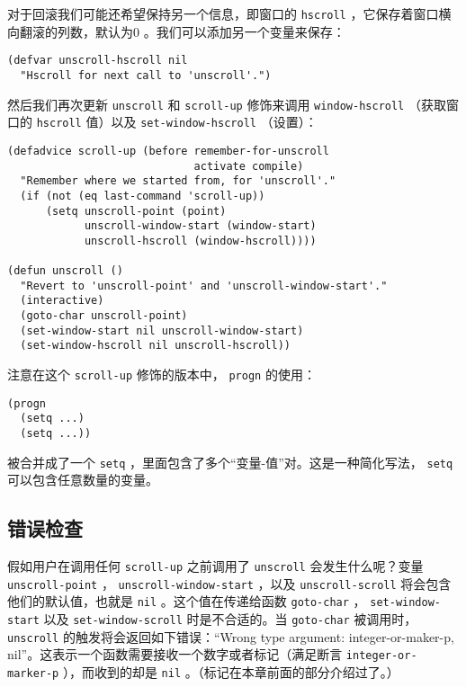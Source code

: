 对于回滚我们可能还希望保持另一个信息，即窗口的 \texttt{hscroll} ，它保存着窗口横向翻滚的列数，默认为0 。我们可以添加另一个变量来保存：

\begin{verbatim}
(defvar unscroll-hscroll nil
  "Hscroll for next call to 'unscroll'.")
\end{verbatim}

然后我们再次更新 \texttt{unscroll} 和 \texttt{scroll-up} 修饰来调用 \texttt{window-hscroll} （获取窗口的 \texttt{hscroll} 值）以及 \texttt{set-window-hscroll} （设置）：

\begin{verbatim}
(defadvice scroll-up (before remember-for-unscroll
                             activate compile)
  "Remember where we started from, for 'unscroll'."
  (if (not (eq last-command 'scroll-up))
      (setq unscroll-point (point)
            unscroll-window-start (window-start)
            unscroll-hscroll (window-hscroll))))

(defun unscroll ()
  "Revert to 'unscroll-point' and 'unscroll-window-start'."
  (interactive)
  (goto-char unscroll-point)
  (set-window-start nil unscroll-window-start)
  (set-window-hscroll nil unscroll-hscroll))
\end{verbatim}

注意在这个 \texttt{scroll-up} 修饰的版本中， \texttt{progn} 的使用：

\begin{verbatim}
(progn
  (setq ...)
  (setq ...))
\end{verbatim}

被合并成了一个 \texttt{setq} ，里面包含了多个“变量-值”对。这是一种简化写法， \texttt{setq} 可以包含任意数量的变量。

\subsection{错误检查}
\label{section:03-Detecting-Errors}

假如用户在调用任何 \texttt{scroll-up} 之前调用了 \texttt{unscroll} 会发生什么呢？变量 \texttt{unscroll-point} ， \texttt{unscroll-window-start} ，以及 \texttt{unscroll-scroll} 将会包含他们的默认值，也就是 \texttt{nil} 。这个值在传递给函数 \texttt{goto-char} ， \texttt{set-window-start} 以及 \texttt{set-window-scroll} 时是不合适的。当 \texttt{goto-char} 被调用时， \texttt{unscroll} 的触发将会返回如下错误：“Wrong type argument: integer-or-maker-p, nil”。这表示一个函数需要接收一个数字或者标记（满足断言 \texttt{integer-or-marker-p} ），而收到的却是 \texttt{nil} 。（标记在本章前面的部分介绍过了。）

